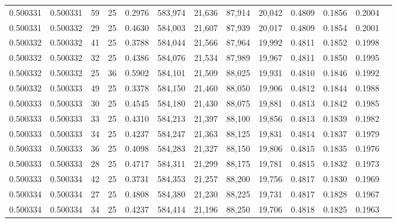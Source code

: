 \begin{tabular}{rrrrrrrrrrrrr}
0.500331 & 0.500331 &    59 &  25 &                                     0.2976 & 583,974 &  21,636 &  87,914 &  20,042 & 0.4809 & 0.1856 & 0.2004 \\
0.500331 & 0.500332 &    29 &  25 &                                     0.4630 & 584,003 &  21,607 &  87,939 &  20,017 & 0.4809 & 0.1854 & 0.2001 \\
0.500332 & 0.500332 &    41 &  25 &                                     0.3788 & 584,044 &  21,566 &  87,964 &  19,992 & 0.4811 & 0.1852 & 0.1998 \\
0.500332 & 0.500332 &    32 &  25 &                                     0.4386 & 584,076 &  21,534 &  87,989 &  19,967 & 0.4811 & 0.1850 & 0.1995 \\
0.500332 & 0.500332 &    25 &  36 &                                     0.5902 & 584,101 &  21,509 &  88,025 &  19,931 & 0.4810 & 0.1846 & 0.1992 \\
0.500332 & 0.500333 &    49 &  25 &                                     0.3378 & 584,150 &  21,460 &  88,050 &  19,906 & 0.4812 & 0.1844 & 0.1988 \\
0.500333 & 0.500333 &    30 &  25 &                                     0.4545 & 584,180 &  21,430 &  88,075 &  19,881 & 0.4813 & 0.1842 & 0.1985 \\
0.500333 & 0.500333 &    33 &  25 &                                     0.4310 & 584,213 &  21,397 &  88,100 &  19,856 & 0.4813 & 0.1839 & 0.1982 \\
0.500333 & 0.500333 &    34 &  25 &                                     0.4237 & 584,247 &  21,363 &  88,125 &  19,831 & 0.4814 & 0.1837 & 0.1979 \\
0.500333 & 0.500333 &    36 &  25 &                                     0.4098 & 584,283 &  21,327 &  88,150 &  19,806 & 0.4815 & 0.1835 & 0.1976 \\
0.500333 & 0.500333 &    28 &  25 &                                     0.4717 & 584,311 &  21,299 &  88,175 &  19,781 & 0.4815 & 0.1832 & 0.1973 \\
0.500333 & 0.500334 &    42 &  25 &                                     0.3731 & 584,353 &  21,257 &  88,200 &  19,756 & 0.4817 & 0.1830 & 0.1969 \\
0.500334 & 0.500334 &    27 &  25 &                                     0.4808 & 584,380 &  21,230 &  88,225 &  19,731 & 0.4817 & 0.1828 & 0.1967 \\
0.500334 & 0.500334 &    34 &  25 &                                     0.4237 & 584,414 &  21,196 &  88,250 &  19,706 & 0.4818 & 0.1825 & 0.1963 \\

\end{tabular}
